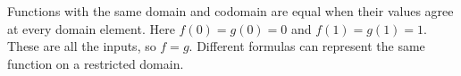 Functions with the same domain and codomain are equal when their values agree at every domain element. Here $f(0)=g(0)=0$ and $f(1)=g(1)=1$. These are all the inputs, so $\boxed{f=g}$. Different formulas can represent the same function on a restricted domain.
